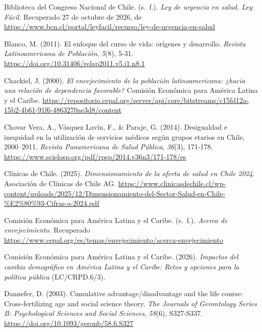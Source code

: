 \documentclass[
  spanish,
  a4paper,
  oneside]{scrbook}
\newlength{\cslhangindent}
\newenvironment{CSLReferences}[2] %
 {\begin{list}{}{%
  \setlength{\itemindent}{0pt}
  \setlength{\leftmargin}{0pt}
  \setlength{\parsep}{0pt}
  \ifodd #1
   \setlength{\leftmargin}{\cslhangindent}
   \setlength{\itemindent}{-1\cslhangindent}
  \fi
  \setlength{\itemsep}{#2\baselineskip}}}
 {\end{list}}
\begin{document}
\begin{CSLReferences}{1}{0}
Biblioteca del Congreso Nacional de Chile. (s.~f.). \emph{Ley de
urgencia en salud. Ley Fácil}. Recuperado 27 de octubre de 2026, de
\url{https://www.bcn.cl/portal/leyfacil/recurso/ley-de-urgencia-en-salud}

Blanco, M. (2011). El enfoque del curso de vida: orígenes y desarrollo.
\emph{Revista Latinoamericana de Población}, \emph{5}(8), 5-31.
\url{https://doi.org/10.31406/relap2011.v5.i1.n8.1}

Chackiel, J. (2000). \emph{El envejecimiento de la población
latinoamericana: ¿hacia una relación de dependencia favorable?} Comisión
Económica para América Latina y el Caribe.
\url{https://repositorio.cepal.org/server/api/core/bitstreams/c15fd12a-15b2-4b61-91f6-4863270ae3d8/content}

Chovar Vera, A., Vásquez Lavín, F., \& Paraje, G. (2014). Desigualdad e
inequidad en la utilización de servicios médicos según grupos etarios en
Chile, 2000--2011. \emph{Revista Panamericana de Salud Pública},
\emph{36}(3), 171-178.
\url{https://www.scielosp.org/pdf/rpsp/2014.v36n3/171-178/es}

Clínicas de Chile. (2025). \emph{Dimensionamiento de la oferta de salud
en Chile 2024}. Asociación de Clínicas de Chile AG.
\url{https://www.clinicasdechile.cl/wp-content/uploads/2025/12/Dimensionamiento-del-Sector-Salud-en-Chile-\%E2\%80\%93-Cifras-a-2024.pdf}

Comisión Económica para América Latina y el Caribe. (s.~f.).
\emph{Acerca de envejecimiento}. Recuperado
\url{https://www.cepal.org/es/temas/envejecimiento/acerca-envejecimiento}

Comisión Económica para América Latina y el Caribe. (2026).
\emph{Impactos del cambio demográfico en América Latina y el Caribe:
Retos y opciones para la política pública} (LC/CRPD.6/3).

Dannefer, D. (2003). Cumulative advantage/disadvantage and the life
course: {Cross-fertilizing} age and social science theory. \emph{The
Journals of Gerontology Series B: Psychological Sciences and Social
Sciences}, \emph{58}(6), S327-S337.
\url{https://doi.org/10.1093/geronb/58.6.S327}


\end{CSLReferences}
\end{document}
